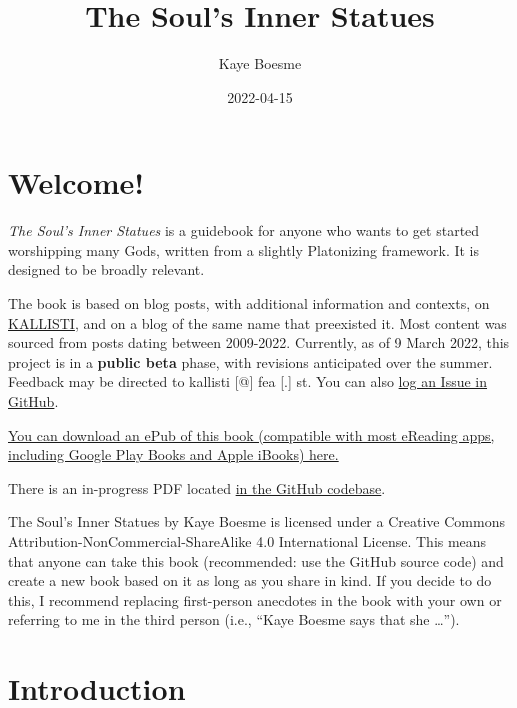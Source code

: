 \documentclass[
]{book}
\title{The Soul's Inner Statues}
\author{Kaye Boesme}
\date{2022-04-15}
\begin{document}
\maketitle

{
\setcounter{tocdepth}{1}
\tableofcontents
}
\hypertarget{welcome}{%
\chapter{Welcome!}\label{welcome}}

\emph{The Soul's Inner Statues} is a guidebook for anyone who wants to get started worshipping many Gods, written from a slightly Platonizing framework. It is designed to be broadly relevant.

The book is based on blog posts, with additional information and contexts, on \href{https://kallisti.blog}{KALLISTI}, and on a blog of the same name that preexisted it. Most content was sourced from posts dating between 2009-2022. Currently, as of 9 March 2022, this project is in a \textbf{public beta} phase, with revisions anticipated over the summer. Feedback may be directed to kallisti {[}@{]} fea {[}.{]} st. You can also \href{https://github.com/kayeofswords/soulsinnerstatues/}{log an Issue in GitHub}.

\href{souls-inner-statues.epub}{You can download an ePub of this book (compatible with most eReading apps, including Google Play Books and Apple iBooks) here.}

There is an in-progress PDF located \href{https://github.com/kayeofswords/soulsinnerstatues/tree/master/docs}{in the GitHub codebase}.

{The Soul's Inner Statues} by Kaye Boesme is licensed under a Creative Commons Attribution-NonCommercial-ShareAlike 4.0 International License. This means that anyone can take this book (recommended: use the GitHub source code) and create a new book based on it as long as you share in kind. If you decide to do this, I recommend replacing first-person anecdotes in the book with your own or referring to me in the third person (i.e., ``Kaye Boesme says that she \ldots{}'').

\hypertarget{intro}{%
\chapter{Introduction}\label{intro}}
\end{document}
